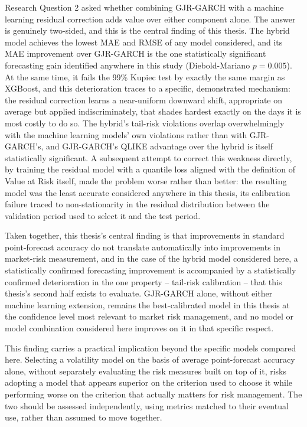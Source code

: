 \documentclass[12pt,a4paper]{article}
\begin{document}
Research Question 2 asked whether combining GJR-GARCH with a machine learning residual correction
adds value over either component alone. The answer is genuinely two-sided, and this is the central
finding of this thesis. The hybrid model achieves the lowest MAE and RMSE of any model considered,
and its MAE improvement over GJR-GARCH is the one statistically significant forecasting gain
identified anywhere in this study (Diebold-Mariano $p=0.005$). At the same time, it fails the 99\%
Kupiec test by exactly the same margin as XGBoost, and this deterioration traces to a specific,
demonstrated mechanism: the residual correction learns a near-uniform downward shift, appropriate on
average but applied indiscriminately, that shades hardest exactly on the days it is most costly to
do so. The hybrid's tail-risk violations overlap overwhelmingly with the machine learning models'
own violations rather than with GJR-GARCH's, and GJR-GARCH's QLIKE advantage over the hybrid is
itself statistically significant. A subsequent attempt to correct this weakness directly, by training
the residual model with a quantile loss aligned with the definition of Value at Risk itself, made the
problem worse rather than better: the resulting model was the least accurate considered anywhere in
this thesis, its calibration failure traced to non-stationarity in the residual distribution between
the validation period used to select it and the test period.

Taken together, this thesis's central finding is that improvements in standard point-forecast
accuracy do not translate automatically into improvements in market-risk measurement, and in the
case of the hybrid model considered here, a statistically confirmed forecasting improvement is
accompanied by a statistically confirmed deterioration in the one property -- tail-risk calibration
-- that this thesis's second half exists to evaluate. GJR-GARCH alone, without either machine
learning extension, remains the best-calibrated model in this thesis at the confidence level most
relevant to market risk management, and no model or model combination considered here improves on
it in that specific respect.

This finding carries a practical implication beyond the specific models compared here. Selecting a
volatility model on the basis of average point-forecast accuracy alone, without separately
evaluating the risk measures built on top of it, risks adopting a model that appears superior on
the criterion used to choose it while performing worse on the criterion that actually matters for
risk management. The two should be assessed independently, using metrics matched to their eventual
use, rather than assumed to move together.
\end{document}
